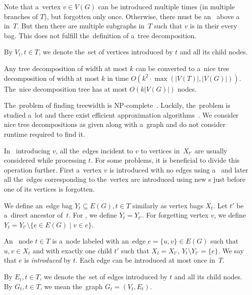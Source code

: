 
Note that a~vertex \( v \in V(G) \) can be introduced multiple times
(in multiple branches of \( T \)),
but forgotten only once.
%
Otherwise, there must be an~\IntroduceVertexNode{} above a~\ForgetVertexNode{} in~\( T \).
But then there are multiple subgraphs in~\( T \)
such that \( v \) is in their every bag.
This does not fulfill the~definition of a~tree decomposition.

By \( V_t, t \in T \), we denote the~set of vertices introduced by \( t \)
and all its child nodes.
%
\begin{lemma}
	Any tree decomposition of width at most \( k \) can be converted to
	a~nice tree decomposition of width at most \( k \)
	in time \( O(k^2 \cdot \max(|V(T)|, |V(G)|)) \).
	The~nice decomposition tree has at most \( O(k|V(G)|) \) nodes.
\end{lemma}

The~problem of finding treewidth is NP-complete~\cite{tree_width_np_complete}.
Luckily, the~problem is studied a~lot and
there exist efficient approximation algorithms~\cite{tree_width_approximation}.
We consider nice tree decompositions as given along with a~graph
and do not consider runtime required to find it.

In~\IntroduceVertexNode{} introducing \( v \), all the~edges incident to \( v \)
to vertices in~\( X_{t'} \) are usually considered while processing \( t \).
%
For some problems, it is beneficial to divide this operation further.
First a~vertex \( v \) is introduced with no edges using a~\IntroduceVertexNode{}
and later all the~edges corresponding to the~vertex are introduced using new \IntroduceEdgeNode{}s
just before one of its vertices is forgotten.

We define an~edge bag \( Y_t \subseteq E(G), t \in T \) similarly as vertex bags \( X_t \).
%
Let \( t' \) be a~direct ancestor of~\( t \).
For \IntroduceVertexNode{}, we define \( Y_t = Y_{t'} \).
For \ForgetVertexNode{} forgetting vertex \( v \),
we define \( Y_t = Y_{t'} \setminus \{ e \in E(G) \mid v \in e\} \).
%
\begin{definition}
	An~\IntroduceEdgeNode{} node \( t \in T \) is a~node
	labeled with an~edge \( e = \{u, v\} \in E(G) \)
	such that \( u, v \in X_t \) and with exactly one child \( t' \)
	such that \( X_t = X_{t'} \), \( Y_t \setminus Y_{t'} = \{e\} \).
	We say that \( e \) is \emph{introduced} by \( t \).
	Each edge can be introduced at most once in~\( T \).
\end{definition}
%
By \( E_t, t \in T \), we denote the~set of edges introduced by \( t \)
and all its child nodes.
By \( G_t, t \in T \), we mean the~graph \( G_t = (V_t, E_t) \).

